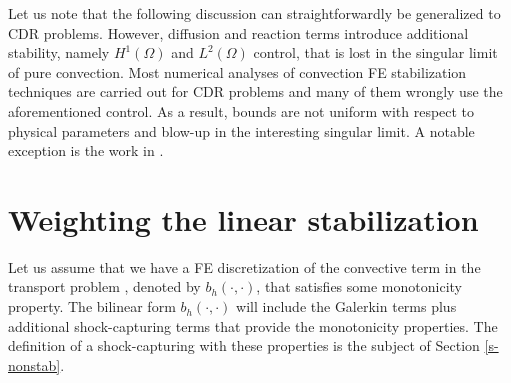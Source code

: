 \begin{remark}
Let us note that the following discussion can straightforwardly be generalized to CDR problems. However, diffusion and reaction terms introduce additional stability, namely $H^1(\Omega)$ and $L^2(\Omega)$ control, that is lost in the singular limit of pure convection. Most numerical analyses of convection FE stabilization techniques are carried out for CDR problems and many of them wrongly use the aforementioned control. As a result, bounds are not uniform with respect to physical parameters and blow-up in the interesting singular limit. A notable exception is the work in \cite{guermond_stabilization_1999}.
\end{remark}





\section{Weighting the linear stabilization}\label{s-weightDMP}
Let us assume that we have a FE discretization of the convective term in the transport problem , denoted by  $b_h(\cdot,\cdot)$, that satisfies some monotonicity property. The bilinear form $b_h(\cdot,\cdot)$ will include the Galerkin terms plus additional shock-capturing terms that provide the monotonicity properties. The definition of a shock-capturing with these properties is the subject of Section \ref{s-nonstab}.

